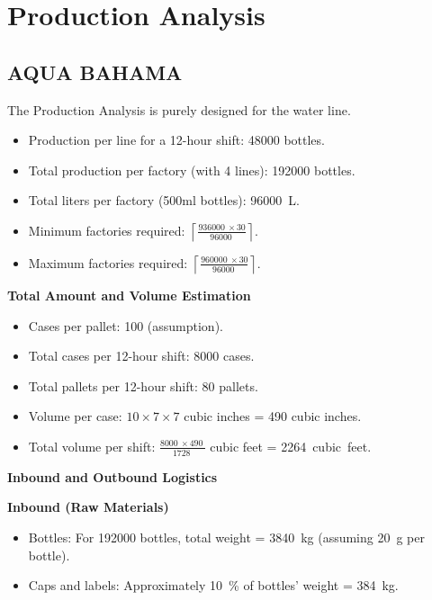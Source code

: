 \documentclass{article}
\begin{document}
\section{Production Analysis}
\subsection{AQUA BAHAMA}
The Production Analysis is purely designed for the water line.\par
\begin{itemize}
    \item Production per line for a 12-hour shift: \SI{48000}{} bottles.
    \item Total production per factory (with 4 lines): \SI{192000}{} bottles.
    \item Total liters per factory (500ml bottles): \SI{96000}{\liter}.
    \item Minimum factories required: $\left\lceil \frac{\SI{936000}{} \times 30}{\SI{96000}{}} \right\rceil$.
    \item Maximum factories required: $\left\lceil \frac{\SI{960000}{} \times 30}{\SI{96000}{}} \right\rceil$.
\end{itemize}

\textbf{Total Amount and Volume Estimation}\par
\begin{itemize}
    \item Cases per pallet: 100 (assumption).
    \item Total cases per 12-hour shift: \SI{8000}{} cases.
    \item Total pallets per 12-hour shift: \SI{80}{} pallets.
    \item Volume per case: $10 \times 7 \times 7$ cubic inches = \SI{490}{} cubic inches.
    \item Total volume per shift: $\frac{\SI{8000}{} \times \SI{490}{}}{\SI{1728}{}}$ cubic feet = \SI{2264}{cubic feet}.
\end{itemize}

\textbf{Inbound and Outbound Logistics}\par
\textbf{Inbound (Raw Materials)}\par
\begin{itemize}
    \item Bottles: For \SI{192000}{} bottles, total weight = \SI{3840}{\kilo\gram} (assuming \SI{20}{\gram} per bottle).
    \item Caps and labels: Approximately \SI{10}{\percent} of bottles’ weight = \SI{384}{\kilo\gram}.
\end{itemize}
\end{document}
